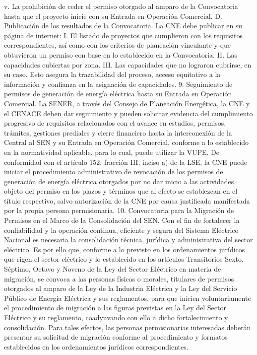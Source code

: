 v.	La prohibición de ceder el permiso otorgado al amparo de la Convocatoria hasta que el proyecto inicie con su Entrada en Operación Comercial.
D. Publicación de los resultados de la Convocatoria.
La CNE debe publicar en su página de internet:
I.	El listado de proyectos que cumplieron con los requisitos correspondientes, así como con los criterios de planeación vinculante y que obtuvieron un permiso con base en lo establecido en la Convocatoria.
II.	Las capacidades cubiertas por zona.
III.	Las capacidades que no lograron cubrirse, en su caso.
Esto asegura la trazabilidad del proceso, acceso equitativo a la información y confianza en la asignación de capacidades.
9. Seguimiento de permisos de generación de energía eléctrica hasta su Entrada en Operación Comercial.
La SENER, a través del Consejo de Planeación Energética, la CNE y el CENACE deben dar seguimiento y pueden solicitar evidencia del cumplimiento progresivo de requisitos relacionados con el avance en estudios, permisos, trámites, gestiones prediales y cierre financiero hasta la interconexión de la Central al SEN y su Entrada en Operación Comercial, conforme a lo establecido en la normatividad aplicable, para lo cual, puede utilizar la VUPE.
De conformidad con el artículo 152, fracción III, inciso a) de la LSE, la CNE puede iniciar el procedimiento administrativo de revocación de los permisos de generación de energía eléctrica otorgados por no dar inicio a las actividades objeto del permiso en los plazos y términos que al efecto se establezcan en el título respectivo, salvo autorización de la CNE por causa justificada manifestada por la propia persona permisionaria.
10. Convocatoria para la Migración de Permisos en el Marco de la Consolidación del SEN.
Con el fin de fortalecer la confiabilidad y la operación continua, eficiente y segura del Sistema Eléctrico Nacional es necesaria la consolidación técnica, jurídica y administrativa del sector eléctrico. Es por ello que, conforme a lo previsto en los ordenamientos jurídicos que rigen el sector eléctrico y lo establecido en los artículos Transitorios Sexto, Séptimo, Octavo y Noveno de la Ley del Sector Eléctrico en materia de migración, se convoca a las personas físicas o morales, titulares de permisos otorgados al amparo de la Ley de la Industria Eléctrica y la Ley del Servicio Público de Energía Eléctrica y sus reglamentos, para que inicien voluntariamente el procedimiento de migración a las figuras previstas en la Ley del Sector Eléctrico y su reglamento, coadyuvando con ello a dicho fortalecimiento y consolidación. Para tales efectos, las personas permisionarias interesadas deberán presentar su solicitud de migración conforme al procedimiento y formatos establecidos en los ordenamientos jurídicos correspondientes.
